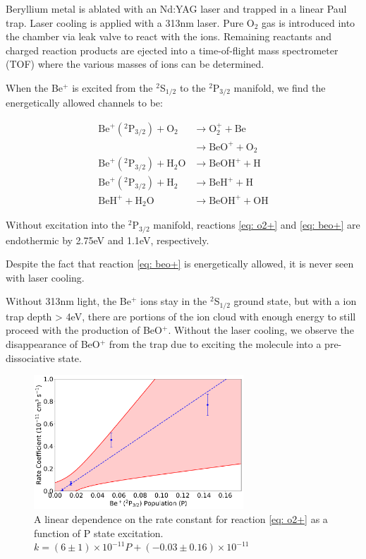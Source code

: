 Beryllium metal is ablated with an Nd:YAG laser and trapped in a linear Paul trap. Laser cooling is applied with a 313nm laser. Pure O$_2$ gas is introduced into the chamber via leak valve to react with the ions. Remaining reactants and charged reaction products are ejected into a time-of-flight mass spectrometer (TOF) where the various masses of ions can be determined.

When the Be$^+$ is excited from the $^2$S$_{1/2}$ to the $^2$P$_{3/2}$ manifold, we find the energetically allowed channels to be:

\begin{align}
    \text{Be}^+(^2\text{P}_{3/2}) + \text{O}_2 & \to \text{O}_2^+ + \text{Be} \label{eq: o2+} \\
    & \to \text{BeO}^+ + \text{O}_2 \label{eq: beo+} \\
    \text{Be}^+(^2\text{P}_{3/2}) + \text{H$_2$O} & \to \text{BeOH}^+ + \text{H} \\
    \text{Be}^+(^2\text{P}_{3/2}) + \text{H}_2 & \to \text{BeH}^+ + \text{H} \\
    \text{BeH}^+ + \text{H$_2$O} & \to \text{BeOH}^+ + \text{OH}
\end{align}

Without excitation into the $^2$P$_{3/2}$ manifold, reactions \ref{eq: o2+} and \ref{eq: beo+} are endothermic by 2.75eV and 1.1eV, respectively.

Despite the fact that reaction \ref{eq: beo+} is energetically allowed, it is never seen with laser cooling.

Without 313nm light, the Be$^+$ ions stay in the $^2$S$_{1/2}$ ground state, but with a ion trap depth > 4eV, there are portions of the ion cloud with enough energy to still proceed with the production of BeO$^+$. Without the laser cooling, we observe the disappearance of BeO$^+$ from the trap due to exciting the molecule into a pre-dissociative state.

\begin{figure}[H]
	\centering
	\includegraphics[width=0.7\textwidth]{images/Be_O2_P_state.png}
	\caption{\label{fig: p-state} A linear dependence on the rate constant for reaction \ref{eq: o2+} as a function of P state excitation. $k = (6 \pm 1) \times 10^{-11} P + (-0.03 \pm 0.16) \times 10^{-11}$}
\end{figure}

